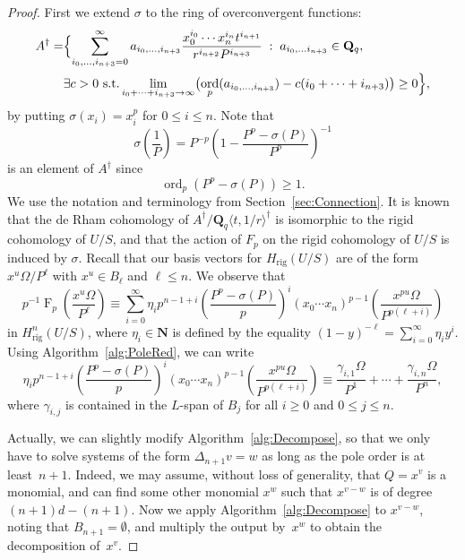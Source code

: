 \documentclass[a4paper,11pt]{article}
\numberwithin{equation}{section}
\newcommand{\NN}{\mathbf{N}} %
\newcommand{\QQ}{\mathbf{Q}} %
\DeclareMathOperator{\ord}{ord}          %
\DeclareMathOperator{\Frob}{F}           %
\providecommand{\Hrig}{H_{\text{rig}}}  %
\theoremstyle{definition}
\begin{document}
\begin{proof}
First we extend $\sigma$ to the ring of overconvergent functions:
\begin{align*}
A^{\dag} =
&\Bigl\{ \sum_{i_0,\dotsc,i_{n+3}=0}^{\infty} a_{i_0, \dotsc, i_{n+3}} 
\frac{x_0^{i_0} \dotsm x_n^{i_{n}}t^{i_{n+1}}}{r^{i_{n+2}} P^{i_{n+3}}} \; : \;
a_{i_0, \dotsc i_{n+3}} \in \QQ_q, \; \\ 
&\exists c > 0 \text{ s.t.} \lim_{i_0+\dotsb+i_{n+3} \rightarrow \infty} \bigl(\ord_p(a_{i_0, \dotsc, i_{n+3}} ) - 
c(i_0+\dotsb+i_{n+3})\bigr) \geq 0 \Bigr\},
\end{align*}
by putting $\sigma(x_i) = x_i^p$ for $0 \leq i \leq n$. Note that
\begin{equation*}
\sigma\left(\frac{1}{P}\right) = 
    P^{-p} \left( 1-\frac{P^p-\sigma(P)}{P^p} \right)^{-1}
\end{equation*}
is an element of $A^{\dag}$ since 
\begin{equation*}
\ord_p\left(P^p-\sigma(P)\right) \geq 1.
\end{equation*}
We use the notation and terminology from Section~\ref{sec:Connection}.
It is known that the de Rham cohomology of 
$A^{\dag}/\QQ_q \langle t,1/r \rangle^{\dag}$ 
is isomorphic to the rigid cohomology of $U/S$, and that the action of 
$F_p$ on the rigid cohomology of $U/S$ is induced by $\sigma$. Recall
that our basis vectors for $\Hrig(U/S)$ 
are of the form $x^u \Omega / P^{\ell}$ with $x^u \in B_{\ell}$ and 
$\ell \leq n$.  We observe that
\begin{equation*}
p^{-1} \Frob_p \left(\frac{x^u \Omega}{P^{\ell}} \right) \equiv
\sum_{i=0}^{\infty} \eta_i p^{n-1+i} \left(\frac{P^p-\sigma(P)}{p} \right)^i 
(x_0 \dotsm x_n)^{p-1} \left( \frac{x^{pu} \Omega}{P^{p(\ell+i)}} \right)
\end{equation*}
in $\Hrig^n(U/S)$, where $\eta_i \in \NN$ is defined by the equality 
$(1-y)^{-\ell} = \sum_{i=0}^{\infty} \eta_i y^i$.
Using Algorithm~\ref{alg:PoleRed}, we can write
\begin{equation} \label{eqn:Froblift}
\eta_i p^{n-1+i} \left(\frac{P^p-\sigma(P)}{p} \right)^i 
(x_0 \dotsm x_n)^{p-1} \left( \frac{x^{pu} \Omega}{P^{p(\ell+i)}} \right) \equiv
\frac{\gamma_{i,1} \Omega}{P^1}+\dotsb+\frac{\gamma_{i,n} \Omega}{P^n},
\end{equation}
where $\gamma_{i,j}$ is contained in the $L$-span of $B_j$ for all $i \geq 0$ and 
$0 \leq j \leq n$. 

Actually, we can slightly modify 
Algorithm~\ref{alg:Decompose}, so that we only have to solve systems of the 
form $\Delta_{n+1} v = w$ as long as the pole order is at least~$n+1$.  
Indeed, we may assume, without loss of generality, that $Q=x^v$ is a monomial, 
and can find some other monomial $x^w$ such that $x^{v-w}$ is of degree 
$(n+1)d-(n+1)$. Now we apply Algorithm~\ref{alg:Decompose} to $x^{v-w}$, 
noting that $B_{n+1}=\emptyset$, and multiply the output by~$x^w$ to obtain 
the decomposition of~$x^v$.


\end{proof}
\end{document}
